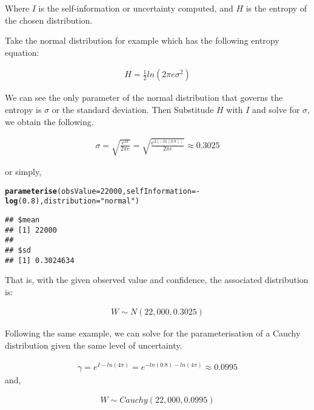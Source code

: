 \documentclass[nojss]{jss}\usepackage[]{graphicx}\usepackage[]{color}
\makeatletter
\newcommand{\hlnum}[1]{\textcolor[rgb]{0.686,0.059,0.569}{#1}}%
\newcommand{\hlstr}[1]{\textcolor[rgb]{0.192,0.494,0.8}{#1}}%
\newcommand{\hlopt}[1]{\textcolor[rgb]{0,0,0}{#1}}%
\newcommand{\hlstd}[1]{\textcolor[rgb]{0.345,0.345,0.345}{#1}}%
\newcommand{\hlkwc}[1]{\textcolor[rgb]{0.333,0.667,0.333}{#1}}%
\newcommand{\hlkwd}[1]{\textcolor[rgb]{0.737,0.353,0.396}{\textbf{#1}}}%
\newenvironment{kframe}{%
 \def\at@end@of@kframe{}%
 \ifinner\ifhmode%
  \def\at@end@of@kframe{\end{minipage}}%
  \begin{minipage}{\columnwidth}%
 \fi\fi%
 \def\FrameCommand##1{\hskip\@totalleftmargin \hskip-\fboxsep
 \colorbox{shadecolor}{##1}\hskip-\fboxsep
     \hskip-\linewidth \hskip-\@totalleftmargin \hskip\columnwidth}%
 \MakeFramed {\advance\hsize-\width
   \@totalleftmargin\z@ \linewidth\hsize
   \@setminipage}}%
 {\par\unskip\endMakeFramed%
 \at@end@of@kframe}
\newenvironment{knitrout}{}{} %
\makeatother
\begin{document}
Where $I$ is the self-information or uncertainty computed, and $H$ is
the entropy of the chosen distribution.


Take the normal distribution for example which has the following entropy equation:

\begin{align}
  H = \frac{1}{2}ln(2\pi e\sigma^2)
\end{align}

We can see the only parameter of the normal distribution that governs
the entropy is $\sigma$ or the standard deviation. Then Substitude $H$
with $I$ and solve for $\sigma$, we obtain the following.

\begin{align}
  \sigma = \sqrt{\frac{e^{2I}}{2\pi e}} = \sqrt{\frac{e^{2(-ln(0.8))}}{2\pi e}} \approx 0.3025
\end{align}

or simply,

\begin{knitrout}
\color{fgcolor}\begin{kframe}
\begin{alltt}
\hlkwd{parameterise}\hlstd{(}\hlkwc{obsValue} \hlstd{=} \hlnum{22000}\hlstd{,} \hlkwc{selfInformation} \hlstd{=} \hlopt{-}\hlkwd{log}\hlstd{(}\hlnum{0.8}\hlstd{),} \hlkwc{distribution} \hlstd{=} \hlstr{"normal"}\hlstd{)}
\end{alltt}
\begin{verbatim}
## $mean
## [1] 22000
## 
## $sd
## [1] 0.3024634
\end{verbatim}
\end{kframe}
\end{knitrout}

That is, with the given observed value and confidence, the associated
distribution is:

\begin{align}
  W \sim N(22,000, 0.3025)
\end{align}

Following the same example, we can solve for the parameterisation of a
Cauchy distribution given the same level of uncertainty.

\begin{align}
  \gamma = e^{I - ln(4\pi)} = e^{-ln(0.8) - ln(4\pi)} \approx 0.0995
\end{align}
and,

\begin{align}
  W \sim Cauchy(22,000, 0.0995)
\end{align}
\end{document}
